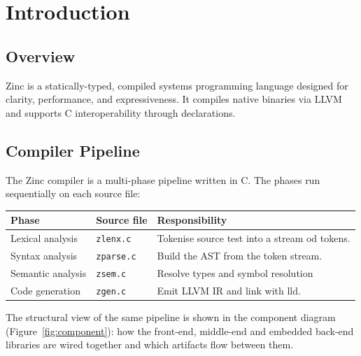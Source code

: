 \chapter{Introduction}

\section{Overview}

Zinc is a statically-typed, compiled systems programming language designed for clarity, performance, and expressiveness.
It compiles native binaries via LLVM and supports C interoperability through
 declarations.

\section{Compiler Pipeline}

The Zinc compiler is a multi-phase pipeline written in C. The phases run sequentially on each source file:

\begin{center}
\begin{tabular}{lll}

\toprule
\textbf{Phase} & \textbf{Source file} & \textbf{Responsibility}\\

\midrule
Lexical analysis & \texttt{zlenx.c} & Tokenise source test into a stream od tokens.\\

Syntax analysis & \texttt{zparse.c} & Build the AST from the token stream.\\

Semantic analysis & \texttt{zsem.c} & Resolve types and symbol resolution\\

Code generation & \texttt{zgen.c} & Emit LLVM IR and link with lld.


\end{tabular}
\end{center}

The structural view of the same pipeline is shown in the component diagram
(Figure~\ref{fig:component}): how the front-end, middle-end and embedded
back-end libraries are wired together and which artifacts flow between them.


